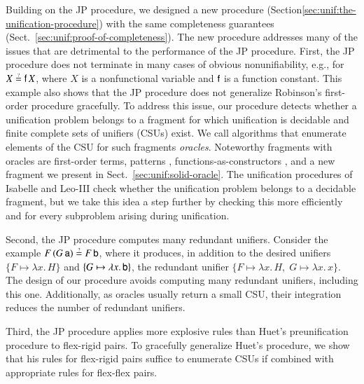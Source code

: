 Building on the JP procedure, we designed a new procedure (Section\ref{sec:unif:the-unification-procedure}) with the same completeness guarantees (Sect.~\ref{sec:unif:proof-of-completeness}).
The new procedure addresses many of the issues that are
detrimental to the performance of the JP procedure.
%
First, the JP procedure does not terminate in many cases of obvious
nonunifiability, e.g., for $X \unif \cst{f} \, X$, where $X$ is a nonfunctional
variable and $\mathsf{f}$ is a function constant. This example also shows that
the JP procedure does not generalize Robinson's first-order procedure gracefully. To address
this issue, our procedure detects whether a unification problem belongs to a
fragment for which unification is decidable and finite complete sets of unifiers (CSUs)
exist.
We call algorithms that enumerate elements of the CSU for such fragments
\emph{oracles}. Noteworthy fragments with oracles are first-order terms,
patterns \cite{tn-93-patterns}, functions-as-constructors
\cite{tl-16-facunif}, and a new fragment 
we present in Sect.~\ref{sec:unif:solid-oracle}.
%
The unification procedures of Isabelle and Leo-III check whether the unification
problem belongs to a decidable fragment, but we take this idea a step further by
checking this more efficiently and for every subproblem arising during
unification.

Second, the JP procedure computes many redundant unifiers. Consider the
example $F \, (G \, \cst{a}) \unif F \, \cst{b}$, where it produces, in addition
to the desired unifiers $\{F \mapsto \lambda x. \, H\}$ and $\{G \mapsto \lambda
x. \, \mathsf{b}\}$, the redundant unifier $\{F \mapsto \lambda x. \, H,\; G \mapsto
\lambda x. \, x\}$. 
The design of our procedure avoids computing many redundant unifiers, including
this one. Additionally, as oracles usually return a small CSU, 
their integration reduces the number of redundant unifiers.

\newpage
Third, the JP procedure applies more explosive rules than Huet's preunification procedure to
flex-rigid pairs. To gracefully generalize Huet's procedure, 
we show that his rules for flex-rigid pairs suffice 
to enumerate CSUs
if combined with appropriate rules for flex-flex pairs.

